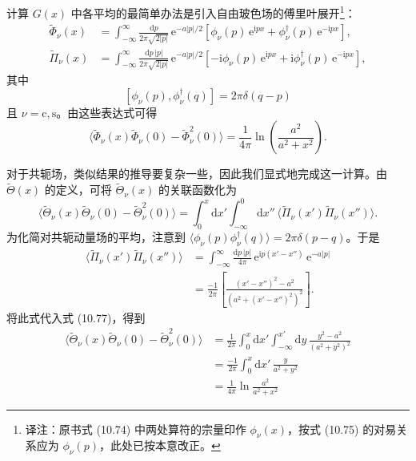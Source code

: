 计算 $G(x)$ 中各平均的最简单办法是引入自由玻色场的傅里叶展开\footnote{译注：原书式 (10.74) 中两处算符的宗量印作 $\phi_{\nu}(x)$，按式 (10.75) 的对易关系应为 $\phi_{\nu}(p)$，此处已按本意改正。}：
\begin{align*}
\tilde{\Phi}_{\nu}(x)&=\int_{-\infty}^{\infty}\frac{\mathrm{d}p}{2\pi\sqrt{2|p|}}\,\mathrm{e}^{-a|p|/2}\left[\phi_{\nu}(p)\,\mathrm{e}^{\mathrm{i}px}+\phi_{\nu}^{\dagger}(p)\,\mathrm{e}^{-\mathrm{i}px}\right],\\
\tilde{\Pi}_{\nu}(x)&=\int_{-\infty}^{\infty}\frac{\mathrm{d}p\,|p|}{2\pi\sqrt{2|p|}}\,\mathrm{e}^{-a|p|/2}\left[-\mathrm{i}\phi_{\nu}(p)\,\mathrm{e}^{\mathrm{i}px}+\mathrm{i}\phi_{\nu}^{\dagger}(p)\,\mathrm{e}^{-\mathrm{i}px}\right],
\tag{10.74}
\end{align*}
其中
\begin{equation*}
\left[\phi_{\nu}(p),\phi_{\nu}^{\dagger}(q)\right]=2\pi\delta(q-p)
\tag{10.75}
\end{equation*}
且 $\nu=\mathrm{c},\mathrm{s}$。由这些表达式可得
\begin{equation*}
\langle\tilde{\Phi}_{\nu}(x)\tilde{\Phi}_{\nu}(0)-\tilde{\Phi}_{\nu}^{2}(0)\rangle=\frac{1}{4\pi}\ln\left(\frac{a^{2}}{a^{2}+x^{2}}\right).
\tag{10.76}
\end{equation*}

对于共轭场，类似结果的推导要复杂一些，因此我们显式地完成这一计算。由 $\tilde{\Theta}(x)$ 的定义，可将 $\tilde{\Theta}_{\nu}(x)$ 的关联函数化为
\begin{equation*}
\langle\tilde{\Theta}_{\nu}(x)\tilde{\Theta}_{\nu}(0)-\tilde{\Theta}_{\nu}^{2}(0)\rangle=\int_{0}^{x}\mathrm{d}x'\int_{-\infty}^{0}\mathrm{d}x''\,\langle\tilde{\Pi}_{\nu}(x')\tilde{\Pi}_{\nu}(x'')\rangle.
\tag{10.77}
\end{equation*}
为化简对共轭动量场的平均，注意到 $\langle\phi_{\nu}(p)\phi_{\nu}^{\dagger}(q)\rangle=2\pi\delta(p-q)$。于是
\begin{align*}
\langle\tilde{\Pi}_{\nu}(x')\tilde{\Pi}_{\nu}(x'')\rangle&=\int_{-\infty}^{\infty}\frac{\mathrm{d}p\,|p|}{4\pi}\,\mathrm{e}^{\mathrm{i}p(x'-x'')}\,\mathrm{e}^{-a|p|}\\
&=\frac{-1}{2\pi}\left[\frac{(x'-x'')^{2}-a^{2}}{\left(a^{2}+(x'-x'')^{2}\right)^{2}}\right].
\tag{10.78}
\end{align*}
将此式代入式 (10.77)，得到
\begin{align*}
\langle\tilde{\Theta}_{\nu}(x)\tilde{\Theta}_{\nu}(0)-\tilde{\Theta}_{\nu}^{2}(0)\rangle&=\frac{1}{2\pi}\int_{0}^{x}\mathrm{d}x'\int_{-\infty}^{x'}\mathrm{d}y\,\frac{y^{2}-a^{2}}{(a^{2}+y^{2})^{2}}\\
&=\frac{-1}{2\pi}\int_{0}^{x}\mathrm{d}x'\,\frac{y}{a^{2}+y^{2}}\\
&=\frac{1}{4\pi}\ln\frac{a^{2}}{a^{2}+x^{2}}
\tag{10.79}
\end{align*}

